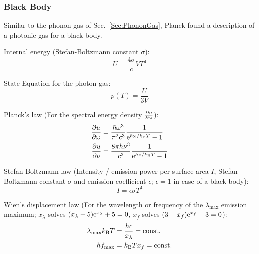 		\subsubsection{Black Body}
			\noindent
			Similar to the phonon gas of Sec.~\ref{Sec:PhononGas}, Planck found a description of a photonic gas for a black body. \vsp

			\noindent
			Internal energy (Stefan-Boltzmann constant $\sigma$):
			\begin{equation}
				U = \frac{4\sigma}{c} V T^4
			\end{equation}

			\noindent
			State Equation for the photon gas:
			\begin{equation}
				p(T) = \frac{U}{3V}
			\end{equation}

			\noindent
			Planck's law (For the spectral energy density $\pdv{u}{\omega}$):
			\begin{equation}
				\begin{aligned}
					\pdv{u}{\omega}(\omega,T) &= \frac{\hbar \omega^3}{\pi^2 c^3} \frac{1}{\mathrm{e}^{\hbar \omega / k_{\text{B}} T} - 1} \\
					\pdv{u}{\nu} (\nu, T) &= \frac{8 \pi h \nu^3}{c^3} \frac{1}{\mathrm{e}^{h \nu / k_{\text{B}} T} - 1} \\
				\end{aligned}
			\end{equation}

			\noindent
			Stefan-Boltzmann law (Intensity / emission power per surface area $I$, Stefan-Boltzmann constant $\sigma$ and emission coefficient $\epsilon$; $\epsilon=1$ in case of a black body):
			\begin{equation}
				I = \epsilon\sigma T^4
			\end{equation}

			\noindent
			Wien's displacement law (For the wavelength or frequency of the $\lambda_{\max}$ emission maximum; $x_\lambda$ solves $(x_\lambda-5)\mathrm{e}^{x_\lambda}+5=0$, $x_f$ solves $(3-x_f)\mathrm{e}^{x_f}+3=0$):
			\begin{equation}
				\begin{aligned}
					\lambda_{\max} k_{\text{B}} T &= \frac{h c}{x_\lambda} = \mathrm{const.} \\
					h f_{\max} &= k_{\text{B}} T x_f = \mathrm{const.} \\
				\end{aligned}
			\end{equation}

